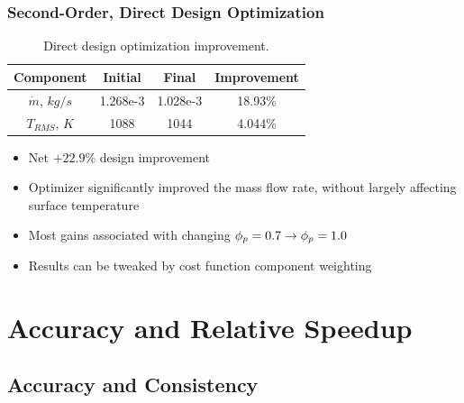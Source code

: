 \documentclass{beamer}
\begin{document}
\begin{frame}
  \frametitle{Second-Order, Direct Design Optimization}
\begin{table}[h]
  \small
  \centering
  \begin{tabular}{c|c|c|c}
    Component & Initial & Final & Improvement\\
    \hline
    $\dot{m}$, $kg/s$ & 1.268e-3 & 1.028e-3 & 18.93\% \\
    $T_{RMS}$, $K$    & 1088     & 1044     & 4.044\%
  \end{tabular}
  \caption{Direct design optimization improvement.}
  \label{tab:design-improvement}
\end{table}
\begin{itemize}
  \item Net $+22.9\%$ design improvement
  \item Optimizer significantly improved the mass flow rate, without largely
    affecting surface temperature
  \item Most gains associated with changing $\phi_p = 0.7 \rightarrow \phi_p = 1.0$
  \item Results can be tweaked by cost function component weighting
\end{itemize}

\end{frame}

\section{Accuracy and Relative Speedup}

\subsection{Accuracy and Consistency}
\end{document}
